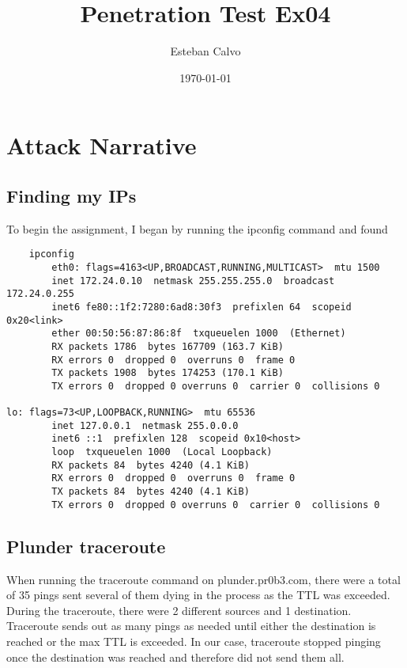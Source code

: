 \documentclass[notitlepage]{article}
\begin{document}
  
\title{Penetration Test Ex04}
\author{Esteban Calvo}
\date{\isodate\today}

\maketitle

\tableofcontents

\newpage


\section{Attack Narrative}
    \subsection{Finding my IPs}
    To begin the assignment, I began by running the ipconfig command and found
    \begin{verbatim}
    ipconfig
        eth0: flags=4163<UP,BROADCAST,RUNNING,MULTICAST>  mtu 1500
        inet 172.24.0.10  netmask 255.255.255.0  broadcast 172.24.0.255
        inet6 fe80::1f2:7280:6ad8:30f3  prefixlen 64  scopeid 0x20<link>
        ether 00:50:56:87:86:8f  txqueuelen 1000  (Ethernet)
        RX packets 1786  bytes 167709 (163.7 KiB)
        RX errors 0  dropped 0  overruns 0  frame 0
        TX packets 1908  bytes 174253 (170.1 KiB)
        TX errors 0  dropped 0 overruns 0  carrier 0  collisions 0

lo: flags=73<UP,LOOPBACK,RUNNING>  mtu 65536
        inet 127.0.0.1  netmask 255.0.0.0
        inet6 ::1  prefixlen 128  scopeid 0x10<host>
        loop  txqueuelen 1000  (Local Loopback)
        RX packets 84  bytes 4240 (4.1 KiB)
        RX errors 0  dropped 0  overruns 0  frame 0
        TX packets 84  bytes 4240 (4.1 KiB)
        TX errors 0  dropped 0 overruns 0  carrier 0  collisions 0
    \end{verbatim}

    \subsection{Plunder traceroute}
    When running the traceroute command on plunder.pr0b3.com, there were a total of 35 pings sent several of them dying in the process as the TTL was exceeded. During the traceroute, 
    there were 2 different sources and 1 destination. Traceroute sends out as many pings as needed until either the destination is reached or the max TTL is exceeded. In our case,
    traceroute stopped pinging once the destination was reached and therefore did not send them all. 
\end{document}
